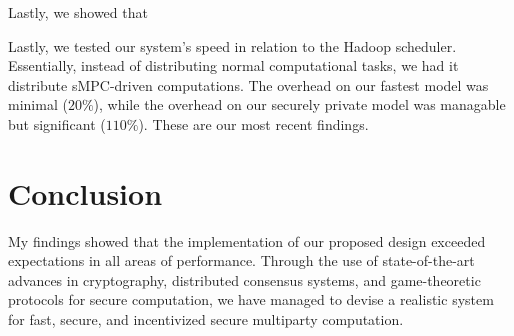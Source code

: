 \documentclass[journal,11pt]{IEEEtran}
\begin{document}
\par Lastly, we showed that 

\par Lastly, we tested our system's speed in relation to the Hadoop scheduler. Essentially, instead of distributing normal computational tasks, we had it distribute sMPC-driven computations. The overhead on our fastest model was minimal ($20\%$), while the overhead on our securely private model was managable but significant ($110\%$). These are our most recent findings.


\section{Conclusion}
\par My findings showed that the implementation of our proposed design exceeded expectations in all areas of performance. Through the use of state-of-the-art advances in cryptography, distributed consensus systems, and game-theoretic protocols for secure computation, we have managed to devise a realistic system for fast, secure, and incentivized secure multiparty computation. 
\end{document}
